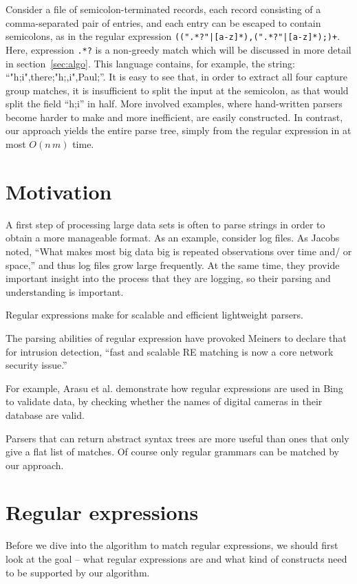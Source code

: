 \documentclass[11pt]{Thesis}
\theoremstyle{definition}
\newcommand{\Secref}[1]{section~\ref{sec:#1}}
\begin{document}
Consider a file of semicolon-terminated records, each record consisting
of a comma-separated pair of entries, and each entry can be escaped
to contain semicolons, as in the regular expression
\texttt{((".*?"|[a-z]*),(".*?"|[a-z]*);)+}. Here, expression
\texttt{.*?} is a non-greedy match which will be discussed in more
detail in \Secref{algo}.  This language contains, for example, the
string: ``"h;i",there;"h;,i",Paul;''.  It is easy to see that, in
order to extract all four capture group matches, it is insufficient
to split the input at the semicolon, as that would split the field
``h;i'' in half.  More involved examples, where hand-written parsers
become harder to make and more inefficient, are easily constructed.
In contrast, our approach yields the entire parse tree, simply from
the regular expression in at most $O(n\,m)$ time.

\section{Motivation}

A first step of processing large data sets is often to parse strings in order 
to obtain a more manageable format. As an example, consider log files.  As
Jacobs\cite{Jaco09a} noted, ``What makes most big data big is repeated
observations over time and/ or space,'' and thus log files grow large
frequently. At the same time, they provide important insight into the process
that they are logging, so their parsing and understanding is important. 

Regular expressions make for scalable and efficient lightweight parsers\cite{Kart96a}.

The parsing abilities of regular expression have provoked Meiners to declare
that for intrusion detection, ``fast and scalable RE matching is
now a core network security issue.'' \cite{Mein10a}

For example, Arasu et al. \cite{Aras12a} demonstrate how regular
expressions are used in Bing to validate data, by checking whether
the names of digital cameras in their database are valid.

Parsers that can return abstract syntax trees are more useful than
ones that only give a flat list of matches. Of course only regular
grammars can be matched by our approach.

\section{Regular expressions}
Before we dive into the algorithm to match regular expressions, we should 
first look at the goal -- what regular expressions are and what kind of 
constructs need to be supported by our algorithm.
\end{document}
